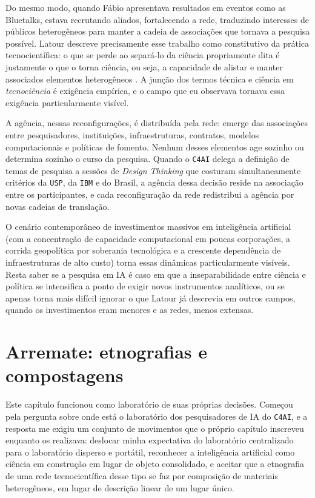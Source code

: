 Do mesmo modo, quando Fábio apresentava resultados em eventos como as Bluetalks, estava recrutando aliados, fortalecendo a rede, traduzindo interesses de públicos heterogêneos para manter a cadeia de associações que tornava a pesquisa possível. Latour descreve precisamente esse trabalho como constitutivo da prática tecnocientífica: o que se perde ao separá-lo da ciência propriamente dita é justamente o que o torna ciência, ou seja, a capacidade de alistar e manter associados elementos heterogêneos \parencite{Latour2011CienciaEmAcao}. A junção dos termos técnica e ciência em \textit{tecnociência} é exigência empírica, e o campo que eu observava tornava essa exigência particularmente visível.

A agência, nessas reconfigurações, é distribuída pela rede: emerge das associações entre pesquisadores, instituições, infraestruturas, contratos, modelos computacionais e políticas de fomento. Nenhum desses elementos age sozinho ou determina sozinho o curso da pesquisa. Quando o \texttt{C4AI} delega a definição de temas de pesquisa a sessões de \textit{Design Thinking} que costuram simultaneamente critérios da \texttt{USP}, da \texttt{IBM} e do Brasil, a agência dessa decisão reside na associação entre os participantes, e cada reconfiguração da rede redistribui a agência por novas cadeias de translação.

O cenário contemporâneo de investimentos massivos em inteligência artificial (com a concentração de capacidade computacional em poucas corporações, a corrida geopolítica por soberania tecnológica e a crescente dependência de infraestruturas de alto custo) torna essas dinâmicas particularmente visíveis. Resta saber se a pesquisa em IA é caso em que a inseparabilidade entre ciência e política se intensifica a ponto de exigir novos instrumentos analíticos, ou se apenas torna mais difícil ignorar o que Latour já descrevia em outros campos, quando os investimentos eram menores e as redes, menos extensas.

\section{Arremate: etnografias e compostagens}
\label{sec:conclusoes-cap1}

Este capítulo funcionou como laboratório de suas próprias decisões. Começou pela pergunta sobre onde está o laboratório dos pesquisadores de IA do \texttt{C4AI}, e a resposta me exigiu um conjunto de movimentos que o próprio capítulo inscreveu enquanto os realizava: deslocar minha expectativa do laboratório centralizado para o laboratório disperso e portátil, reconhecer a inteligência artificial como ciência em construção em lugar de objeto consolidado, e aceitar que a etnografia de uma rede tecnocientífica desse tipo se faz por composição de materiais heterogêneos, em lugar de descrição linear de um lugar único.

